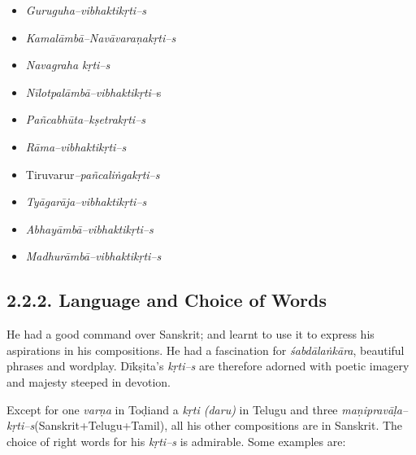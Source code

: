 \begin{itemize}
\item \textit{Guruguha–vibhaktikṛti–s}

 \item \textit{Kamalāmbā–Navāvaraṇakṛti–s}

 \item \textit{Navagraha kṛti–s}

 \item \textit{Nīlotpalāmbā–vibhaktikṛti}–s

 \item \textit{Pañcabhūta–kṣetrakṛti–s}

 \item \textit{Rāma–vibhaktikṛti–s}

 \item Tiruvarur\textit{–pañcaliṅgakṛti–s}

 \item \textit{Tyāgarāja–vibhaktikṛti–s}

 \item \textit{Abhayāmbā–vibhaktikṛti–s}

 \item \textit{Madhurāmbā–vibhaktikṛti–s}

\end{itemize}



\subsection*{2.2.2. Language and Choice of Words}

He had a good command over Sanskrit; and learnt to use it to express his aspirations in his compositions. He had a fascination for \textit{śabdālaṅkāra}, beautiful phrases and wordplay. Dīkṣita’s \textit{kṛti–s} are therefore adorned with poetic imagery and majesty steeped in devotion.

Except for one \textit{varṇa} in Toḍiand a\textit{ kṛti (daru)} in Telugu and three \textit{maṇipravāḷa– kṛti–s}(Sanskrit+Telugu+Tamil), all his other compositions are in Sanskrit. The choice of right words for his \textit{kṛti–s} is admirable. Some examples are:

